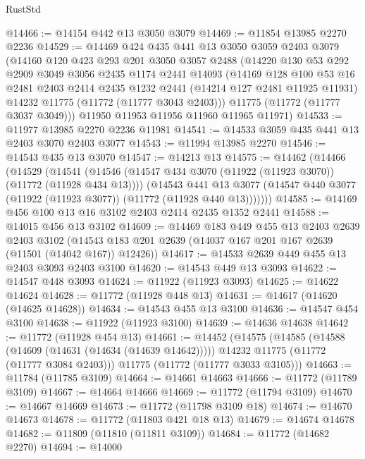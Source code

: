 \begin{lexlean}{RustStd}
\begin{coremodule}
@14466 := @14154 @442 @13 @3050 @3079
@14469 := @11854 @13985 @2270 @2236
@14529 := @14469
    @424
    @435
    @441
    @13
    @3050
    @3059
    @2403
    @3079
    (@14160
      @120
      @423
      @293
      @201
      @3050
      @3057
      @2488
      (@14220
        @130
        @53
        @292
        @2909
        @3049
        @3056
        @2435
        @1174
        @2441
        @14093
        (@14169
          @128
          @100
          @53
          @16
          @2481
          @2403
          @2414
          @2435
          @1232
          @2441
          (@14214 @127 @2481 @11925 @11931)
          @14232
          @11775
          (@11772 (@11777 @3043 @2403)))
        @11775
        (@11772 (@11777 @3037 @3049)))
      @11950
      @11953
      @11956
      @11960
      @11965
      @11971)
@14533 := @11977 @13985 @2270 @2236 @11981
@14541 := @14533 @3059 @435 @441 @13 @2403 @3070 @2403 @3077
@14543 := @11994 @13985 @2270
@14546 := @14543 @435 @13 @3070
@14547 := @14213 @13
@14575 := @14462
    (@14466
      (@14529
        (@14541
          (@14546 (@14547 @434 @3070 (@11922 (@11923 @3070)) (@11772 (@11928 @434 @13))))
          (@14543
            @441
            @13
            @3077
            (@14547 @440 @3077 (@11922 (@11923 @3077)) (@11772 (@11928 @440 @13)))))))
@14585 := @14169 @456 @100 @13 @16 @3102 @2403 @2414 @2435 @1352 @2441
@14588 := @14015 @456 @13 @3102
@14609 := @14469
    @183
    @449
    @455
    @13
    @2403
    @2639
    @2403
    @3102
    (@14543 @183 @201 @2639 (@14037 @167 @201 @167 @2639 (@11501 (@14042 @167)) @12426))
@14617 := @14533 @2639 @449 @455 @13 @2403 @3093 @2403 @3100
@14620 := @14543 @449 @13 @3093
@14622 := @14547 @448 @3093
@14624 := @11922 (@11923 @3093)
@14625 := @14622 @14624
@14628 := @11772 (@11928 @448 @13)
@14631 := @14617 (@14620 (@14625 @14628))
@14634 := @14543 @455 @13 @3100
@14636 := @14547 @454 @3100
@14638 := @11922 (@11923 @3100)
@14639 := @14636 @14638
@14642 := @11772 (@11928 @454 @13)
@14661 := @14452
    (@14575
      (@14585
        (@14588 (@14609 (@14631 (@14634 (@14639 @14642)))))
        @14232
        @11775
        (@11772 (@11777 @3084 @2403)))
      @11775
      (@11772 (@11777 @3033 @3105)))
@14663 := @11784 (@11785 @3109)
@14664 := @14661 @14663
@14666 := @11772 (@11789 @3109)
@14667 := @14664 @14666
@14669 := @11772 (@11794 @3109)
@14670 := @14667 @14669
@14673 := @11772 (@11798 @3109 @18)
@14674 := @14670 @14673
@14678 := @11772 (@11803 @421 @18 @13)
@14679 := @14674 @14678
@14682 := @11809 (@11810 (@11811 @3109))
@14684 := @11772 (@14682 @2270)
@14694 := @14000

\end{coremodule}
\end{lexlean}
